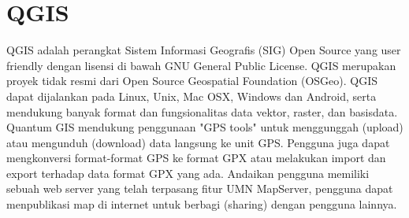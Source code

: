 \section{QGIS}
QGIS adalah perangkat Sistem Informasi Geografis (SIG) Open Source yang user friendly dengan lisensi di bawah GNU General Public License. QGIS merupakan proyek tidak resmi dari Open Source Geospatial Foundation (OSGeo). QGIS dapat dijalankan pada Linux, Unix, Mac OSX, Windows dan Android, serta mendukung banyak format dan fungsionalitas data vektor, raster, dan basisdata.
Quantum GIS mendukung penggunaan "GPS tools" untuk menggunggah (upload) atau mengunduh (download) data langsung ke unit GPS. Pengguna juga dapat mengkonversi format-format GPS ke format GPX atau melakukan import dan export terhadap data format GPX yang ada.
Andaikan pengguna memiliki sebuah web server yang telah terpasang fitur UMN MapServer, pengguna dapat menpublikasi map di internet untuk berbagi (sharing) dengan pengguna lainnya.


